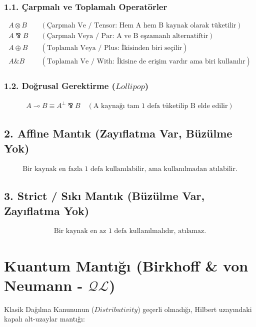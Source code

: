 \documentclass[11pt, a4paper]{article}
\begin{document}
\subsubsection{1.1. Çarpmalı ve Toplamalı Operatörler}
\begin{align}
A \otimes B \quad &(\text{Çarpmalı Ve / Tensor: Hem A hem B kaynak olarak tüketilir}) \\
A \bindnasrepma B \quad &(\text{Çarpmalı Veya / Par: A ve B eşzamanlı alternatiftir}) \\
A \oplus B \quad &(\text{Toplamalı Veya / Plus: İkisinden biri seçilir}) \\
A \mathbin{\&} B \quad &(\text{Toplamalı Ve / With: İkisine de erişim vardır ama biri kullanılır})
\end{align}

\subsubsection{1.2. Doğrusal Gerektirme ($Lollipop$)}
\begin{align}
A \multimap B \equiv A^{\bot} \bindnasrepma B \quad (\text{A kaynağı tam 1 defa tüketilip B elde edilir})
\end{align}

\subsection{2. Affine Mantık (Zayıflatma Var, Büzülme Yok)}
\begin{align}
\text{Bir kaynak en fazla 1 defa kullanılabilir, ama kullanılmadan atılabilir.}
\end{align}

\subsection{3. Strict / Sıkı Mantık (Büzülme Var, Zayıflatma Yok)}
\begin{align}
\text{Bir kaynak en az 1 defa kullanılmalıdır, atılamaz.}
\end{align}

\section{Kuantum Mantığı (Birkhoff \& von Neumann - $\mathcal{Q}\mathcal{L}$)}

Klasik Dağılma Kanununun ($Distributivity$) geçerli olmadığı, Hilbert uzayındaki kapalı alt-uzaylar mantığı:
\end{document}
